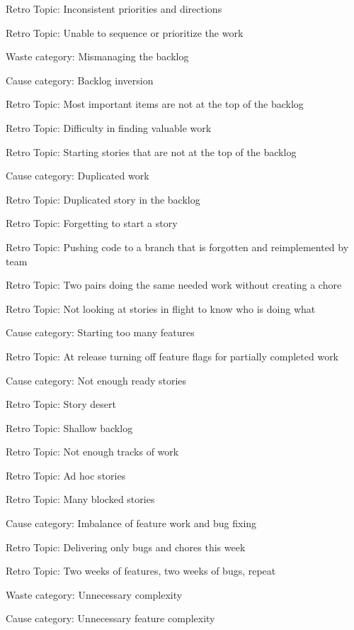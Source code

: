 \quad \quad \quad Retro Topic: Inconsistent priorities and directions

\quad \quad \quad Retro Topic: Unable to sequence or prioritize the work


Waste category: Mismanaging the backlog

\quad Cause category: Backlog inversion

\quad \quad Retro Topic: Most important items are not at the top of the backlog

\quad \quad Retro Topic: Difficulty in finding valuable work

\quad \quad Retro Topic: Starting stories that are not at the top of the backlog

\quad Cause category: Duplicated work

\quad \quad Retro Topic: Duplicated story in the backlog

\quad \quad Retro Topic: Forgetting to start a story

\quad \quad Retro Topic: Pushing code to a branch that is forgotten and reimplemented by team

\quad \quad Retro Topic: Two pairs doing the same needed work without creating a chore

\quad \quad Retro Topic: Not looking at stories in flight to know who is doing what

\quad Cause category: Starting too many features

\quad \quad Retro Topic: At release turning off feature flags for partially completed work

\quad Cause category: Not enough ready stories

\quad \quad Retro Topic: Story desert

\quad \quad Retro Topic: Shallow backlog

\quad \quad Retro Topic: Not enough tracks of work

\quad \quad Retro Topic: Ad hoc stories

\quad \quad Retro Topic: Many blocked stories

\quad Cause category: Imbalance of feature work and bug fixing

\quad \quad Retro Topic: Delivering only bugs and chores this week

\quad \quad Retro Topic: Two weeks of features, two weeks of bugs, repeat




Waste category: Unnecessary complexity

\quad Cause category: Unnecessary feature complexity

